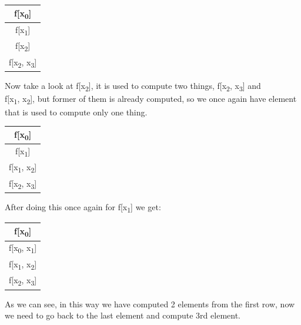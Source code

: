 \documentclass{article}
\begin{document}
\begin{center}
    \begin{tabular}{| c |}
        \hline
        f[x\textsubscript{0}]\\ 
        \hline
        f[x\textsubscript{1}]\\
        \hline
        f[x\textsubscript{2}]\\
        \hline
        f[x\textsubscript{2}, x\textsubscript{3}]\\ 
        \hline
    \end{tabular}
\end{center}
\newpage
Now take a look at f[x\textsubscript{2}], it is used to compute two things, f[x\textsubscript{2}, x\textsubscript{3}] and  \\f[x\textsubscript{1}, x\textsubscript{2}], but former of them is already computed, so we once again have element that is used to compute only one thing.

\begin{center}
    \begin{tabular}{| c |}
        \hline
        f[x\textsubscript{0}]\\ 
        \hline
        f[x\textsubscript{1}]\\
        \hline
        f[x\textsubscript{1}, x\textsubscript{2}]\\
        \hline
        f[x\textsubscript{2}, x\textsubscript{3}]\\ 
        \hline
    \end{tabular}
\end{center}
After doing this once again for f[x\textsubscript{1}] we get:


\begin{center}
    \begin{tabular}{| c |}
        \hline
        f[x\textsubscript{0}]\\ 
        \hline
        f[x\textsubscript{0}, x\textsubscript{1}]\\
        \hline
        f[x\textsubscript{1}, x\textsubscript{2}]\\
        \hline
        f[x\textsubscript{2}, x\textsubscript{3}]\\ 
        \hline
    \end{tabular}
\end{center}
As we can see, in this way we have computed 2 elements from the first row, now we need to go back to the last element and compute 3rd element.
\end{document}
